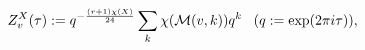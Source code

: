 \begin{equation}
Z^X_v(\tau):= q^{-{\frac{(r+1)\chi(X)}{24}}}\sum_k \chi({\cal M}(v,k))q^k
\;\;\;(q:=\exp(2\pi i \tau)),\label{zxvt}
\end{equation}

